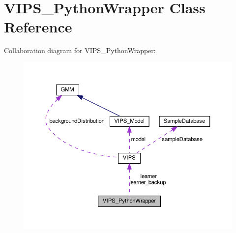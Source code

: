 \hypertarget{classVIPS__PythonWrapper}{}\section{V\+I\+P\+S\+\_\+\+Python\+Wrapper Class Reference}
\label{classVIPS__PythonWrapper}


Collaboration diagram for V\+I\+P\+S\+\_\+\+Python\+Wrapper\+:
\nopagebreak
\begin{figure}[H]
\begin{center}
\leavevmode
\includegraphics[width=350pt]{classVIPS__PythonWrapper__coll__graph}
\end{center}
\end{figure}
